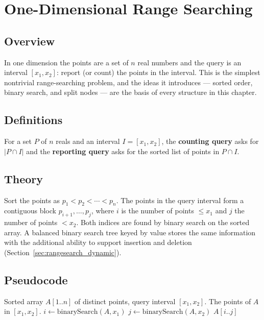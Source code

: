 \section{One-Dimensional Range Searching}
\label{sec:rangesearch_1d}

\subsection{Overview}

In one dimension the points are a set of $n$ real numbers and the query is
an interval $[x_1, x_2]$: report (or count) the points in the interval. This
is the simplest nontrivial range-searching problem, and the ideas it
introduces --- sorted order, binary search, and split nodes --- are the
basis of every structure in this chapter.

\subsection{Definitions}

\begin{definition}\label{def:rangesearch_counting}
  For a set $P$ of $n$ reals and an interval $I=[x_1,x_2]$, the
  \textbf{counting query} asks for $|P \cap I|$ and the \textbf{reporting
  query} asks for the sorted list of points in $P \cap I$.
\end{definition}

\subsection{Theory}

Sort the points as $p_1 < p_2 < \cdots < p_n$. The points in the query
interval form a contiguous block $p_{i+1}, \dots, p_j$, where $i$ is the
number of points $\le x_1$ and $j$ the number of points $< x_2$. Both
indices are found by binary search on the sorted array. A balanced binary
search tree keyed by value stores the same information with the additional
ability to support insertion and deletion (Section~\ref{sec:rangesearch_dynamic}).

\subsection{Pseudocode}

\begin{algorithm}[htbp]
\caption{One-Dimensional Range Query}
\label{alg:rangesearch_1d}
\begin{algorithmic}[1]
\Require Sorted array $A[1..n]$ of distinct points, query interval $[x_1,x_2]$.
\Ensure The points of $A$ in $[x_1,x_2]$.
  \State $i \gets \text{binarySearch}(A, x_1)$  
  \State $j \gets \text{binarySearch}(A, x_2)$  
  \State \Return $A[i..j]$
\EndFunction
\end{algorithmic}
\end{algorithm}

